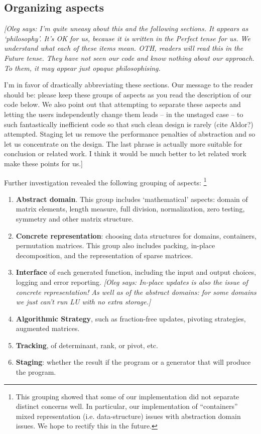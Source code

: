 \documentclass[draft]{elsart}
\newcommand{\oleg}[1]{{\it [Oleg says: #1]}}
\begin{document}
\subsection{Organizing aspects}

\oleg{I'm quite uneasy about this and the following sections. It
  appears as `philosophy'. It's OK for us, because it is written in
  the Perfect tense for us. We understand what each of these items
  mean. OTH, readers will read this in the Future tense. They have not
  seen our code and know nothing about our approach. To them, it may
  appear just opaque philosophising. 

I'm in favor of drastically abbreviating these sections. Our message
to the reader should be: please keep these groups of aspects as you
read the description of our code below. We also point out that
attempting to separate these aspects and letting the users
independently change them leads -- in the unstaged case -- to such
fantastically inefficient code so that such clean design is rarely
(cite Aldor?) attempted. Staging let us remove the performance
penalties of abstraction and so let us concentrate on the design. 
The last phrase is actually more suitable for conclusion or related
work. I think it would be much better to let related work make these
points for us.}

Further investigation revealed the following grouping of aspects:%
\footnote{This grouping showed that some of our implementation did not
separate distinct concerns well. In
particular, our implementation of ``containers'' 
mixed representation (i.e. data-structure) issues with abstraction
domain issues.  We hope to rectify this in the future.}

\begin{enumerate}
	\item \textbf{Abstract domain}.  This group includes
	  `mathematical' aspects: domain of matrix elements, length
	  measure, full division, normalization, zero testing,
	  symmetry and other matrix structure.
	\item \textbf{Concrete representation}: choosing data
	  structures for domains, containers, permutation
	  matrices. This group also includes packing, in-place
	  decomposition, and the
	  representation of sparse matrices.
	\item \textbf{Interface} of each generated function, including
	  the input and output choices, logging and error reporting.
		\oleg{In-place updates is also the issue of concrete
		  representation! As well as of the abstract domains:
		  for some domains we just can't run LU with no extra
		  storage.} 
	\item \textbf{Algorithmic Strategy}, such as fraction-free
	  updates, pivoting strategies, augmented matrices.
	\item \textbf{Tracking}, of determinant, rank, or pivot, etc.
	\item \textbf{Staging}: whether the result if the program or a
	  generator that will produce the program.
\end{enumerate}
\end{document}
